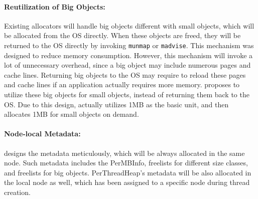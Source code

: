 \paragraph{Reutilization of Big Objects:} Existing allocators will handle big objects different with small objects, which will be allocated from the OS directly. When these objects are freed, they will be returned to the OS directly by invoking \texttt{munmap} or \texttt{madvise}. This mechanism was designed to reduce memory consumption. However, this mechanism will invoke a lot of unnecessary overhead, since a big object may include numerous pages and cache lines.  Returning big objects to the OS may require to reload these pages and cache lines if an application actually requires more memory.  
\NM{} proposes to utilize these big objects for small objects, instead of returning them back to the OS. Due to this design, \NM{} actually utilizes 1MB as the basic unit, and then allocates 1MB for small objects on demand. 

\paragraph{Node-local Metadata:} \NM{} designs the metadata meticulously, which will be always allocated in the same node. Such metadata includes the PerMBInfo, freelists for different size classes, and freelists for big objects. PerThreadHeap's metadata will be also allocated in the local node as well, which has been assigned to a specific node during thread creation. 


 